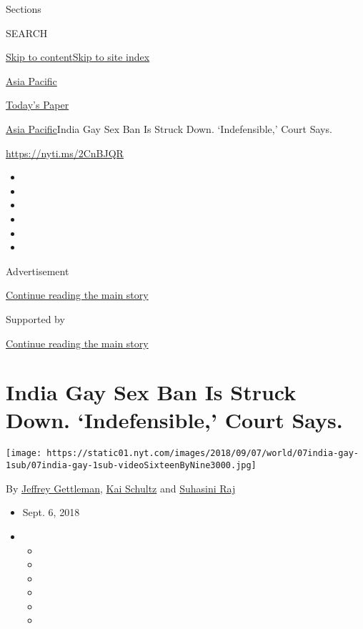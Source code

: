 Sections

SEARCH

\protect\hyperlink{site-content}{Skip to
content}\protect\hyperlink{site-index}{Skip to site index}

\href{https://www.nytimes.com/section/world/asia}{Asia Pacific}

\href{https://myaccount.nytimes.com/auth/login?response_type=cookie\&client_id=vi}{}

\href{https://www.nytimes.com/section/todayspaper}{Today's Paper}

\href{/section/world/asia}{Asia Pacific}\textbar{}India Gay Sex Ban Is
Struck Down. `Indefensible,' Court Says.

\url{https://nyti.ms/2CnBJQR}

\begin{itemize}
\item
\item
\item
\item
\item
\item
\end{itemize}

Advertisement

\protect\hyperlink{after-top}{Continue reading the main story}

Supported by

\protect\hyperlink{after-sponsor}{Continue reading the main story}

\hypertarget{india-gay-sex-ban-is-struck-down-indefensible-court-says}{%
\section{India Gay Sex Ban Is Struck Down. `Indefensible,' Court
Says.}\label{india-gay-sex-ban-is-struck-down-indefensible-court-says}}

\texttt{[image: https://static01.nyt.com/images/2018/09/07/world/07india-gay-1sub/07india-gay-1sub-videoSixteenByNine3000.jpg]}

By \href{https://www.nytimes.com/by/jeffrey-gettleman}{Jeffrey
Gettleman}, \href{https://www.nytimes.com/by/kai-schultz}{Kai Schultz}
and \href{https://www.nytimes.com/by/suhasini-raj}{Suhasini Raj}

\begin{itemize}
\item
  Sept. 6, 2018
\item
  \begin{itemize}
  \item
  \item
  \item
  \item
  \item
  \item
  \end{itemize}
\end{itemize}

